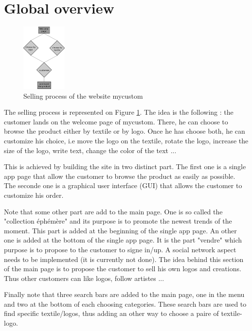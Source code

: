 \section{Global overview}

\begin{figure}[!ht]
	\centering
	\includegraphics[width=0.2\textwidth]{overview/sellingProcess}
	\caption{Selling process of the website mycustom}
	\label{fig:sellingProcess}
\end{figure}

The selling process is represented on Figure \ref{fig:sellingProcess}. The idea is the following : the customer lands on the welcome page of mycustom. There, he can choose to browse the product either by textile or by logo. Once he has choose both, he can customize his choice, i.e move the logo on the textile, rotate the logo, increase the size of the logo, write text, change the color of the text ...

This is achieved by building the site in two distinct part. The first one is a single app page that allow the customer to browse the product as easily as possible. The seconde one is a graphical user interface (GUI) that allows the customer to customize his order. 

Note that some other part are add to the main page. One is so called the "collection éphémère" and its purpose is to promote the newest trends of the moment. This part is added at the beginning of the single app page.  An other one is added at the bottom of the single app page. It is the part "vendre" which purpose is to propose to the customer to signe in/up. A social network aspect needs to be implemented (it is currently not done). The idea behind this section of the main page is to propose the customer to sell his own logos and creations. Thus other customers can like logos, follow artistes ... 

Finally note that three search bars are added to the main page, one in the menu and two at the bottom of each choosing categories. These search bars are used to find specific textile/logos, thus adding an other way to choose a paire of textile-logo. 

